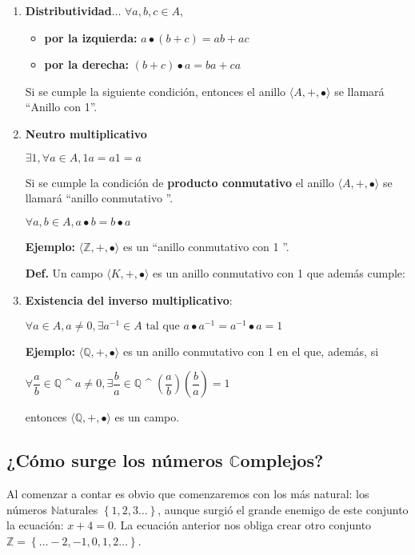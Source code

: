\documentclass[12pt]{article}
\begin{document}
\begin{enumerate}
    \newpage
    \item \textbf{Distributividad$\dots$} \newline 
        $\forall a,b,c \in A,$
        \begin{itemize}
            \item \textbf{por la izquierda:} $a\bullet( b + c) = ab+ac$
            \item \textbf{por la derecha:}  $( b + c)\bullet a = ba+ca$
        \end{itemize}
    Si se cumple la siguiente condición, entonces el anillo $\langle A,+,\bullet\rangle$ se llamará \textquotedblleft Anillo con 1\textquotedblright.
    \item \textbf{Neutro multiplicativo}
    \begin{center}
        $\exists{} 1, \forall a \in A, 1a=a1=a$
    \end{center}
    Si se cumple la condición de \textbf{producto conmutativo} el anillo $\langle  A,+,\bullet \rangle$ se llamará \textquotedblleft anillo conmutativo \textquotedblright. 
    \begin{center}
        $\forall a,b\in A, a\bullet b = b \bullet a$
    \end{center}
     \textbf{Ejemplo:} $\langle  \mathds{Z}, +, \bullet \rangle$ es un \textquotedblleft anillo conmutativo con 1 \textquotedblright.

    \textbf{Def.} Un campo $\langle K, +, \bullet \rangle$ es un anillo conmutativo con 1 que además cumple:
    \item \textbf{Existencia del inverso multiplicativo}:
    \begin{center}
        $\forall a \in A, a\not = 0, \exists a^{-1}\in A \text{ tal que } a\bullet a^{-1}=a^{-1}\bullet a =1$
    \end{center}
    \textbf{Ejemplo:} $\langle \mathds{Q}, +, \bullet \rangle$ es un anillo conmutativo con 1 en el que, además, si \newline
    \begin{center}
    $\forall\dfrac{a}{b}\in\mathds{Q}$ \^{} $ a\not=0 ,\exists \dfrac{b}{a} \in \mathds{Q}$ \^{} $\left( \dfrac{a}{b} \right)\left( \dfrac{b}{a} \right)=1$
    \end{center}
    entonces $\langle \mathds{Q}, +, \bullet \rangle$ es un campo.
\end{enumerate}
\newpage
\subsection*{¿Cómo surge los números $\mathds{C}$omplejos?}
Al comenzar a contar es obvio que comenzaremos con los más natural:
los números $\mathds{N}$aturales $\left\{1,2,3 \dots \right\} $, aunque surgió el grande enemigo de 
este conjunto la ecuación: $x+4=0$. La ecuación anterior nos obliga crear otro conjunto $\mathds{Z} = \left\{\dots-2,-1,0,1,2\dots\right\}$.
\end{document}
